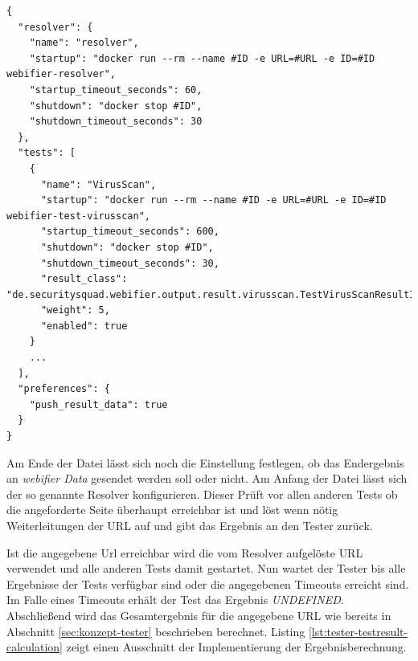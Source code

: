 \begin{scriptsize}
\begin{lstlisting}
{
  "resolver": {
    "name": "resolver",
    "startup": "docker run --rm --name #ID -e URL=#URL -e ID=#ID webifier-resolver",
    "startup_timeout_seconds": 60,
    "shutdown": "docker stop #ID",
    "shutdown_timeout_seconds": 30
  },
  "tests": [
    {
      "name": "VirusScan",
      "startup": "docker run --rm --name #ID -e URL=#URL -e ID=#ID webifier-test-virusscan",
      "startup_timeout_seconds": 600,
      "shutdown": "docker stop #ID",
      "shutdown_timeout_seconds": 30,
      "result_class": "de.securitysquad.webifier.output.result.virusscan.TestVirusScanResultInfo",
      "weight": 5,
      "enabled": true
    }
    ...
  ],
  "preferences": {
    "push_result_data": true
  }
}
\end{lstlisting}
\end{scriptsize}

Am Ende der Datei lässt sich noch die Einstellung festlegen, ob das Endergebnis an \textit{webifier
Data} gesendet werden soll oder nicht. Am Anfang der Datei lässt sich der so genannte
Resolver konfigurieren. Dieser Prüft vor allen anderen Tests ob die angeforderte Seite überhaupt
erreichbar ist und löst wenn nötig Weiterleitungen der \acs{URL} auf und gibt das Ergebnis an den
Tester zurück.

Ist die angegebene Url erreichbar wird die vom Resolver aufgelöste \acs{URL} verwendet und alle
anderen Tests damit gestartet. Nun wartet der Tester bis alle Ergebnisse der Tests verfügbar sind
oder die angegebenen Timeouts erreicht sind. Im Falle eines Timeouts erhält der Test das Ergebnis
\textit{UNDEFINED}. Abschließend wird das Gesamtergebnis für die angegebene \acs{URL} wie bereits in
Abschnitt \ref{sec:konzept-tester} beschrieben berechnet. Listing
\ref{lst:tester-testresult-calculation} zeigt einen Ausschnitt der Implementierung der
Ergebnisberechnung.

\newpage

